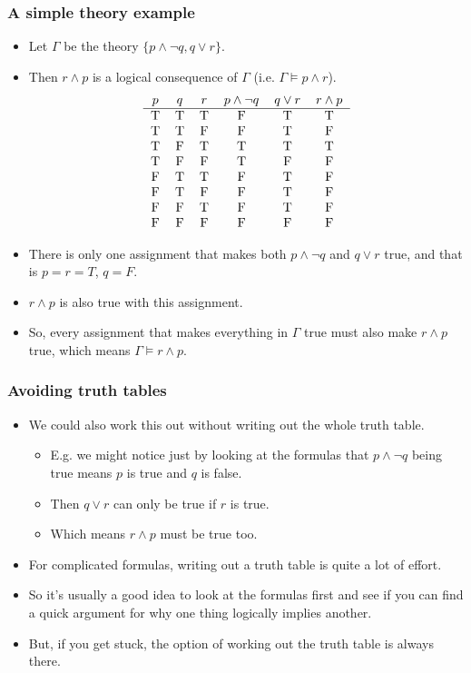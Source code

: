 \documentclass[handout]{beamer}
\begin{document}
\begin{frame}
\frametitle{A simple theory example}
\begin{itemize}
\item Let $\Gamma$ be the theory $\{p\wedge \neg q, q\vee r\}$. 
\item Then $r\wedge p$ is a logical consequence of $\Gamma$ (i.e. $\Gamma\models p\wedge r$).
\[\begin{tabular}{ c c c c c c c}
 $p$ & $q$ & $r$ & $p\wedge \neg q$ & $q\vee r$ & $r\wedge p$ \\ \hline 
 T & T & T & F & T & T \\  
 T & T & F & F & T & F \\
 T & F & T & T & T & T \\
 T & F & F & T & F & F \\
 F & T & T & F & T & F \\
 F & T & F & F & T & F \\
 F & F & T & F & T & F \\
 F & F & F & F & F & F
\end{tabular}\]
\item There is only one assignment that makes both $p\wedge \neg q$ and $q\vee r$ true, and that is $p=r=T$, $q=F$. 
\item $r\wedge p$ is also true with this assignment. 
\item So, every assignment that makes everything in $\Gamma$ true must also make $r\wedge p$ true, which means $\Gamma\models r\wedge p$.
\end{itemize}
\end{frame}

\begin{frame}
\frametitle{Avoiding truth tables}
\begin{itemize}
\item We could also work this out without writing out the whole truth table. 
\begin{itemize}
\item E.g. we might notice just by looking at the formulas that $p\wedge \neg q$ being true means $p$ is true and $q$ is false.
\item Then $q\vee r$ can only be true if $r$ is true. 
\item Which means $r\wedge p$ must be true too.
\end{itemize}
\vspace{0.2cm}
\item For complicated formulas, writing out a truth table is quite a lot of effort.
\vspace{0.2cm}
\item So it's usually a good idea to look at the formulas first and see if you can find a quick argument for why one thing logically implies another. 
\vspace{0.2cm}
\item But, if you get stuck, the option of working out the truth table is always there.
\end{itemize}
\end{frame}
\end{document}
